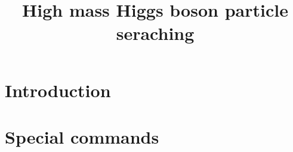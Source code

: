 \documentclass[PhD,binding=0.6cm]{../sapthesis}
\title{High mass Higgs boson particle seraching}
\begin{document}
\frontmatter

\maketitle

\dedication{ dedica a ...}

\begin{abstract}

\lipsum[1-2]

\end{abstract}

\begin{acknowledgments}[Ringraziamenti]

\lipsum[1-2]

\end{acknowledgments}

\tableofcontents

\chapter{Introduction}

\lipsum[1-2]


\mainmatter


{} 

{} 

{} 


{} 

{} 
{}
{}
{}
{}
{}

{} 
{} 

\appendix
\chapter{Special commands }
\end{document}
